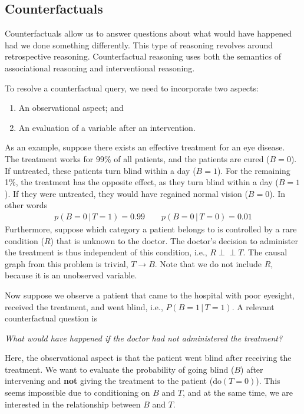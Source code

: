 \documentclass{article}
\newcommand{\giv}{\,|\,}
\newcommand{\indep}{\perp \!\!\! \perp}
\begin{document}
\subsection{Counterfactuals}

Counterfactuals allow us to answer questions about what would have happened had we done something differently. This type of reasoning revolves around retrospective reasoning. Counterfactual reasoning uses both the semantics of associational reasoning and interventional reasoning. 

\noindent To resolve a counterfactual query, we need to incorporate two aspects:
\begin{enumerate}
    \item An observational aspect; and
    \item An evaluation of a variable after an intervention.
\end{enumerate}
\noindent As an example, suppose there exists an effective treatment for an eye disease. The treatment works for 99\% of all patients, and the patients are cured ($B=0$). If untreated, these patients turn blind within a day ($B=1$). For the remaining 1\%, the treatment has the opposite effect, as they turn blind within a day ($B=1$). If they were untreated, they would have regained normal vision ($B=0$). In other words
\begin{align*}
    p(B=0 \giv T=1) = 0.99 \qquad p(B=0 \giv T=0) = 0.01
\end{align*}
\noindent Furthermore, suppose which category a patient belongs to is controlled by a rare condition ($R$) that is unknown to the doctor. The doctor's decision to administer the treatment is thus independent of this condition, i.e., $R \indep T$. The causal graph from this problem is trivial, $T \rightarrow B$. Note that we do not include $R$, because it is an unobserved variable. 

Now suppose we observe a patient that came to the hospital with poor eyesight, received the treatment, and went blind, i.e., $P(B=1 \giv T=1)$. A relevant counterfactual question is
\begin{center}
    \textit{What would have happened if the doctor had not administered the treatment?}
\end{center}
\noindent Here, the observational aspect is that the patient went blind after receiving the treatment. We want to evaluate the probability of going blind ($B$) after intervening and \textbf{not} giving the treatment to the patient (do$(T=0)$). This seems impossible due to conditioning on $B$ and $T$, and at the same time, we are interested in the relationship between $B$ and $T$. 
\end{document}
